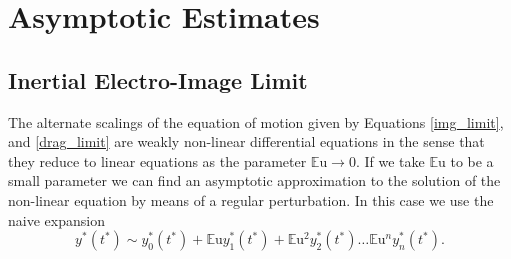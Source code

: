 \documentclass[12pt,a4paper,oneside]{book}
\begin{document}
\section{Asymptotic Estimates}
\subsection{Inertial Electro-Image Limit}
The alternate scalings of the equation of motion given by Equations \ref{img_limit}, and \ref{drag_limit} are weakly non-linear differential equations in the sense that they reduce to linear equations as the parameter $\mathbb{E}\mbox{u} \rightarrow 0$. If we take $\mathbb{E}\mbox{u}$ to be a small parameter we can find an asymptotic approximation to the solution of the non-linear equation by means of a regular perturbation. In this case we use the naive expansion
\begin{equation}
{y^*}({t^*}) \sim y^*_0({t^*}) + \mathbb{E}\mbox{u} y^*_1({t^*}) + \mathbb{E}\mbox{u}^2 y^*_2({t^*}) \ldots \mathbb{E}\mbox{u}^n y^*_n ({t^*})  . \label{regular_pert}
\end{equation}
\end{document}
